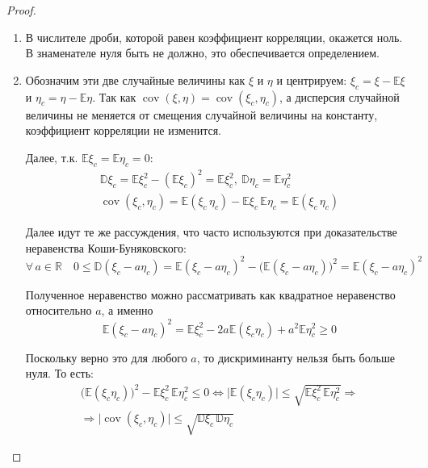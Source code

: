 \begin{proof}
    \begin{enumerate}
    \item 
        В числителе дроби, которой равен коэффициент корреляции,
        окажется ноль. В знаменателе нуля быть не должно, это обеспечивается определением.

    \item 
        Обозначим эти две случайные величины как $\xi$ и $\eta$ и центрируем: $\xi_c = \xi - \mathbb{E}\xi$ и $\eta_c = \eta - \mathbb{E}\eta$. 
        Так как $\operatorname{cov}(\xi, \eta)=\operatorname{cov}\left(\xi_{c}, \eta_{c}\right)$, а дисперсия случайной величины не меняется от смещения случайной величины на константу, коэффициент корреляции не изменится.
        
        Далее, т.к. $\mathbb{E} \xi_{c}=\mathbb{E} \eta_{c}=0$:
        \begin{gather*}
            \mathbb{D} \xi_{c}=\mathbb{E} \xi_{c}^{2}-\left(\mathbb{E} \xi_{c}\right)^{2}=\mathbb{E} \xi_{c}^{2},~ \mathbb{D} \eta_{c}=\mathbb{E} \eta_{c}^{2} \\
            \operatorname{cov}\left(\xi_{c}, \eta_{c}\right)=\mathbb{E}\left(\xi_{c} \, \eta_{c}\right) - \mathbb{E} \xi_{c} \, \mathbb{E} \eta_{c}=\mathbb{E}\left(\xi_{c} \, \eta_{c}\right)
        \end{gather*}
        
        Далее идут те же рассуждения, что часто используются при доказательстве неравенства Коши-Буняковского:
        \begin{equation*}
            \forall \, a \in \mathbb{R} \quad 0 \leqslant \mathbb{D}\left(\xi_{c}-a \eta_{c}\right) = 
            \mathbb{E}\left(\xi_{c} - a \eta_{c}\right)^{2} - \bigl(\mathbb{E}\left(\xi_{c}-a \eta_{c}\right)\bigr)^{2} = 
            \mathbb{E}\left(\xi_{c}-a \eta_{c}\right)^{2}
        \end{equation*}
        
        Полученное неравенство можно рассматривать как квадратное неравенство относительно $a$, а именно
        \begin{equation*}
            \mathbb{E}\left(\xi_{c}-a \eta_{c}\right)^{2}=\mathbb{E} \xi_{c}^{2}-2 a \mathbb{E}\left(\xi_{c} \eta_{c}\right)+a^{2} \mathbb{E} \eta_{c}^{2} \geqslant 0
        \end{equation*}
        
        Поскольку верно это для любого $a$, то дискриминанту нельзя быть больше нуля. То есть:
        \begin{multline*}
            \bigl(\mathbb{E}\left(\xi_{c} \eta_{c}\right) \bigr)^{2} - \mathbb{E} \xi_{c}^{2} \, \mathbb{E} \eta_{c}^{2} \leqslant 0 \Longleftrightarrow \bigl|\mathbb{E}\left(\xi_{c} \eta_{c}\right)\bigr| \leqslant \sqrt{\mathbb{E} \xi_{c}^{2} \, \mathbb{E} \eta_{c}^{2}} \Rightarrow \\
            \Rightarrow \bigl|\operatorname{cov}\left(\xi_{c}, \eta_{c}\right)\bigr| \leqslant \sqrt{\mathbb{D} \xi_{c} \, \mathbb{D} \eta_{c}}
        \end{multline*}
        

\end{enumerate}
\end{proof}
